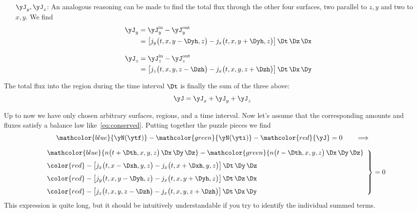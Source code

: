 \begin{itemize}
\begin{itemize}
  \item[$\yJ_{y}, \yJ_{z}$:] An analogous reasoning can be made to find the total flux through the other four surfaces, two parallel to $z,y$ and two to $x,y$. We find
    \begin{align}
      \label{neq:Fyflux}
      \begin{split}
        \yJ_{y} &= \yJ_{y}^{\text{in}} - \yJ_{y}^{\text{out}}
        \\&= \bigl[ j_{y}\bigl(t, x, y-\Dyh, z\bigr) - j_{x}\bigl(t, x, y+\Dyh, z\bigr)\bigr]
        \,\Dt\,\Dz\,\Dx
      \end{split}
      \\[3\jot]
      \label{neq:Fzflux}
      \begin{split}
        \yJ_{z} &= \yJ_{z}^{\text{in}} - \yJ_{z}^{\text{out}}
        \\&= \bigl[ j_{z}\bigl(t, x, y, z-\Dzh\bigr) - j_{x}\bigl(t, x, y, z+\Dzh\bigr)\bigr]
        \,\Dt\,\Dx\,\Dy
      \end{split}
    \end{align}
  \end{itemize}
The total flux into the region during the time interval $\Dt$ is finally the sum of the three above:
\begin{equation}
  \label{neq:Fflux}
  \yJ = \yJ_{x} + \yJ_{y} + \yJ_{z}
\end{equation}
\end{itemize}

Up to now we have only chosen arbitrary surfaces, regions, and a time interval. Now let's assume that the corresponding amounts and fluxes satisfy a balance law like~\eqref{eq:conserved}. Putting together the puzzle pieces we find
\begin{multline*}
  \label{neq:balance_pieces}
    \mathcolor{blue}{\yN(\ytf)} -\mathcolor{green}{\yN(\yti)} - \mathcolor{red}{\yJ} = 0 \qquad     \Longrightarrow
    \\[2\jot]
    \left.\begin{aligned}
      &\mathcolor{blue}{n\bigl(t+\Dth, x,y,z\bigr)\,\Dx\,\Dy\,\Dz}
      - \mathcolor{green}{n\bigl(t-\Dth, x,y,z\bigr)\,\Dx\,\Dy\,\Dz}
      \\[\jot]\quad&\color{red}-\bigl[ j_{x}\bigl(t, x-\Dxh, y, z\bigr) - j_{x}\bigl(t, x+\Dxh, y, z\bigr)\bigr]
      \,\Dt\,\Dy\,\Dz
      \\[\jot]\quad&\color{red}-\bigl[ j_{y}\bigl(t, x, y-\Dyh, z\bigr) - j_{x}\bigl(t, x, y+\Dyh, z\bigr)\bigr]
      \,\Dt\,\Dz\,\Dx
      \\[\jot]\quad&\color{red}-\bigl[ j_{z}\bigl(t, x, y, z-\Dzh\bigr) - j_{x}\bigl(t, x, y, z+\Dzh\bigr)\bigr]
      \,\Dt\,\Dx\,\Dy
    \end{aligned}\enspace\right\}=0
\end{multline*}
This expression is quite long, but it should be intuitively understandable if you try to identify the individual summed terms.

